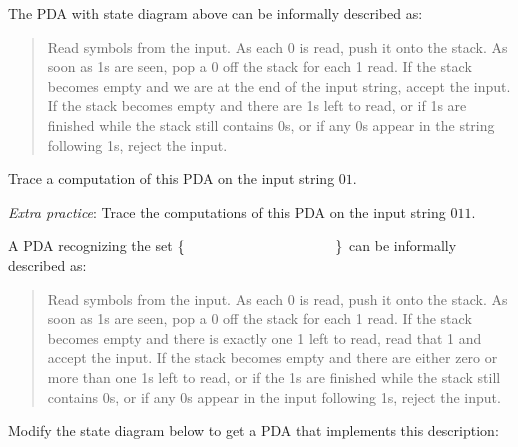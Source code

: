 \documentclass[12pt, oneside]{article}
\begin{document}
The PDA with state diagram above can be informally described as:
\begin{quote}
    Read symbols from the input. As each 0 is read, push it onto the stack. 
    As soon as 1s are seen, pop a 0 off the stack for each 1 read. 
    If the stack becomes empty and we are at the end of the input string, accept the input. 
    If the stack becomes empty and there are 1s left to read, 
    or if 1s are finished while the stack still contains 0s, or if any 0s
    appear in the string following 1s, 
    reject the input.
\end{quote}
    

Trace a computation of this PDA on the input string $01$.

\vfill
    
{\it Extra practice}: Trace the computations of this PDA on the input string $011$.

\vfill

\newpage
A PDA recognizing the set $\{ \hspace{1.5 in} \}$ can be informally described as:
\begin{quote}
    Read symbols from the input. As each 0 is read, push it onto the stack. 
    As soon as 1s are seen, pop a 0 off the stack for each 1 read. 
    If the stack becomes empty and there is exactly one 1 left to read, read that 1 and accept the input. 
    If the stack becomes empty and there are either zero or more than one 1s left to read, 
    or if the 1s are finished while the stack still contains 0s, or if any 0s appear in the input following 1s, 
    reject the input.
\end{quote}
Modify the state diagram below to get a PDA that implements this description:

    
\end{document}
